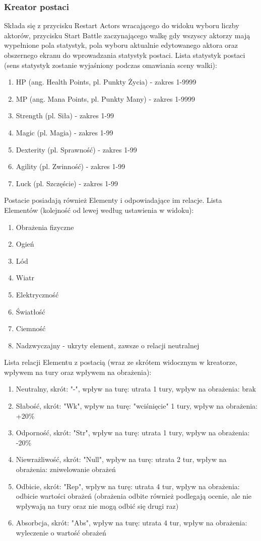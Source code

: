 \documentclass{SGGW-thesis}
\begin{document}
\subsubsection{Kreator postaci}
Składa się z przycisku Restart Actors wracającego do widoku wyboru liczby aktorów, przycisku Start Battle zaczynającego walkę gdy wszyscy aktorzy mają wypełnione pola statystyk, pola wyboru aktualnie edytowanego aktora oraz obszernego ekranu do wprowadzania statystyk postaci.
Lista statystyk postaci (sens statystyk zostanie wyjaśniony podczas omawiania sceny walki):
\begin{enumerate}
  \item{HP (ang. Health Points, pl. Punkty Życia) - zakres 1-9999}
  \item{MP (ang. Mana Points, pl. Punkty Many) - zakres 1-9999}
  \item{Strength (pl. Siła) - zakres 1-99}
  \item{Magic (pl. Magia) - zakres 1-99}
  \item{Dexterity (pl. Sprawność) - zakres 1-99}
  \item{Agility (pl. Zwinność) - zakres 1-99}
  \item{Luck (pl. Szczęście) - zakres 1-99}
\end{enumerate}
Postacie posiadają również Elementy i odpowiadające im relacje. Lista Elementów (kolejność od lewej według ustawienia w widoku):
\begin{enumerate}
  \item{Obrażenia fizyczne}
  \item{Ogień}
  \item{Lód}
  \item{Wiatr}
  \item{Elektryczność}
  \item{Światłość}
  \item{Ciemność}
  \item{Nadzwyczajny - ukryty element, zawsze o relacji neutralnej}
\end{enumerate}
Lista relacji Elementu z postacią (wraz ze skrótem widocznym w kreatorze, wpływem na tury oraz wpływem na obrażenia):
\begin{enumerate}
  \item{Neutralny, skrót: "-", wpływ na turę: utrata 1 tury, wpływ na obrażenia: brak}
  \item{Słabość, skrót: "Wk", wpływ na turę: "wciśnięcie" 1 tury, wpływ na obrażenia: +20\%}
  \item{Odporność, skrót: "Str", wpływ na turę: utrata 1 tury, wpływ na obrażenia: -20\%}
  \item{Niewrażliwość, skrót: "Null", wpływ na turę: utrata 2 tur, wpływ na obrażenia: zniwelowanie obrażeń}
  \item{Odbicie, skrót: "Rep", wpływ na turę: utrata 4 tur, wpływ na obrażenia: odbicie wartości obrażeń (obrażenia odbite również podlegają ocenie, ale nie wpływają na tury oraz nie mogą odbić się drugi raz)}
  \item{Absorbcja, skrót: "Abs", wpływ na turę: utrata 4 tur, wpływ na obrażenia: wyleczenie o wartość obrażeń}
\end{enumerate}
\end{document}
